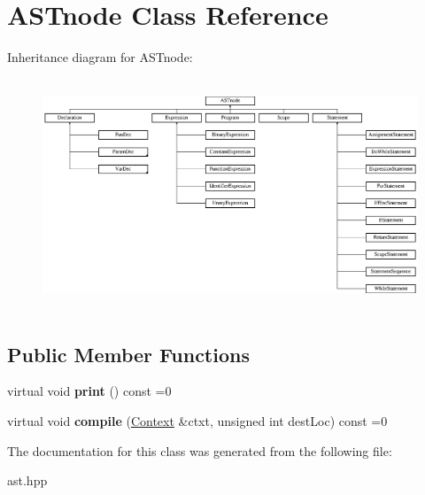 \hypertarget{class_a_s_tnode}{}\section{A\+S\+Tnode Class Reference}
\label{class_a_s_tnode}
Inheritance diagram for A\+S\+Tnode\+:\begin{figure}[H]
\begin{center}
\leavevmode
\includegraphics[height=6.956522cm]{class_a_s_tnode}
\end{center}
\end{figure}
\subsection*{Public Member Functions}
\begin{DoxyCompactItemize}
\item 
\mbox{\label{class_a_s_tnode_a30c3d4f96b7675f9639d5540eb53470d}} 
virtual void {\bfseries print} () const =0
\item 
\mbox{\label{class_a_s_tnode_a45d25ab7b40875c6aedecb9ed41d7d80}} 
virtual void {\bfseries compile} (\hyperlink{class_context}{Context} \&ctxt, unsigned int dest\+Loc) const =0
\end{DoxyCompactItemize}


The documentation for this class was generated from the following file\+:\begin{DoxyCompactItemize}
\item 
ast.\+hpp\end{DoxyCompactItemize}

